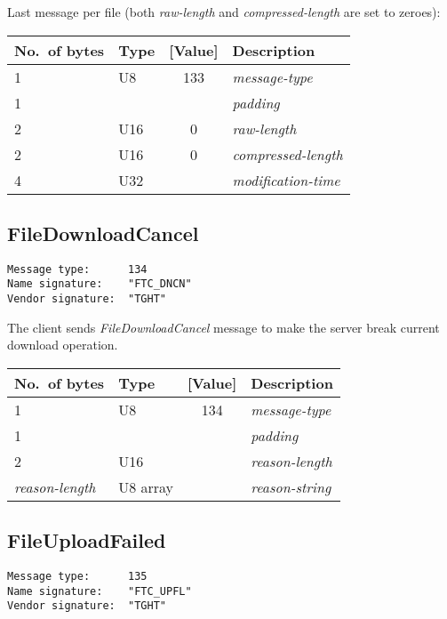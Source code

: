 \documentclass[a4paper]{article}
\newcommand{\typestr}[1]{\textit{#1}}
\begin{document}
Last message per file (both \typestr{raw-length} and
\typestr{compressed-length} are set to zeroes):

\begin{tabular}{l|lc|l} \hline
No.\ of bytes & Type & [Value] & Description \\ \hline
1 & U8  & 133 & \typestr{message-type} \\
1 &     &     & \typestr{padding} \\
2 & U16 &   0 & \typestr{raw-length} \\
2 & U16 &   0 & \typestr{compressed-length} \\
4 & U32 &     & \typestr{modification-time} \\
\hline\end{tabular}


\newpage
\subsection{FileDownloadCancel}
\begin{verbatim}
Message type:      134
Name signature:    "FTC_DNCN"
Vendor signature:  "TGHT"
\end{verbatim}

The client sends \typestr{FileDownloadCancel} message to make the
server break current download operation.

\begin{tabular}{l|lc|l} \hline
No.\ of bytes & Type & [Value] & Description \\ \hline
1 & U8  & 134 & \typestr{message-type} \\
1 &     &     & \typestr{padding} \\
2 & U16 &     & \typestr{reason-length} \\
\typestr{reason-length} & U8 array & & \typestr{reason-string} \\
\hline\end{tabular}


\newpage
\subsection{FileUploadFailed}
\begin{verbatim}
Message type:      135
Name signature:    "FTC_UPFL"
Vendor signature:  "TGHT"
\end{verbatim}
\end{document}
